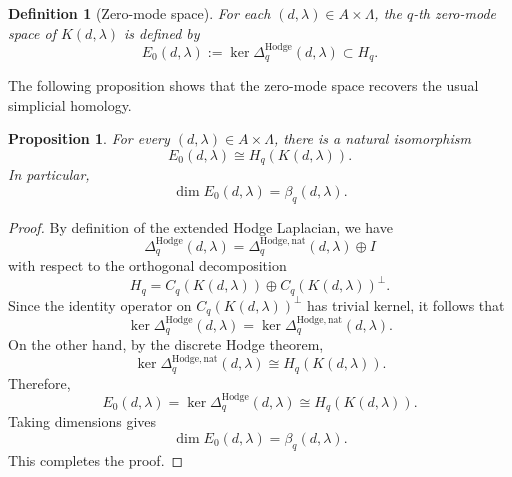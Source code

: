 \documentclass[10pt,a4paper]{amsart}
\newtheorem{proposition}[theorem]{Proposition}%
\newtheorem{definition}{Definition}%
\begin{document}
\begin{definition}[Zero-mode space]
For each \((d,\lambda)\in A\times\Lambda\), the \emph{\(q\)-th zero-mode space}
of \(K(d,\lambda)\) is defined by
\[
E_0(d,\lambda)
:=
\ker \Delta_q^{\mathrm{Hodge}}(d,\lambda)
\subset H_q.
\]
\end{definition}

The following proposition shows that the zero-mode space recovers the usual
simplicial homology.

\begin{proposition}
For every \((d,\lambda)\in A\times\Lambda\), there is a natural isomorphism
\[
E_0(d,\lambda)\cong H_q(K(d,\lambda)).
\]
In particular,
\[
\dim E_0(d,\lambda)=\beta_q(d,\lambda).
\]
\end{proposition}

\begin{proof}
By definition of the extended Hodge Laplacian, we have
\[
\Delta_q^{\mathrm{Hodge}}(d,\lambda)
=
\Delta_q^{\mathrm{Hodge},\mathrm{nat}}(d,\lambda)\oplus I
\]
with respect to the orthogonal decomposition
\[
H_q
=
C_q(K(d,\lambda))\oplus C_q(K(d,\lambda))^\perp .
\]
Since the identity operator on \(C_q(K(d,\lambda))^\perp\) has trivial kernel,
it follows that
\[
\ker \Delta_q^{\mathrm{Hodge}}(d,\lambda)
=
\ker \Delta_q^{\mathrm{Hodge},\mathrm{nat}}(d,\lambda).
\]
On the other hand, by the discrete Hodge theorem,
\[
\ker \Delta_q^{\mathrm{Hodge},\mathrm{nat}}(d,\lambda)
\cong
H_q(K(d,\lambda)).
\]
Therefore,
\[
E_0(d,\lambda)
=
\ker \Delta_q^{\mathrm{Hodge}}(d,\lambda)
\cong
H_q(K(d,\lambda)).
\]
Taking dimensions gives
\[
\dim E_0(d,\lambda)=\beta_q(d,\lambda).
\]
This completes the proof.
\end{proof}






\end{document}
